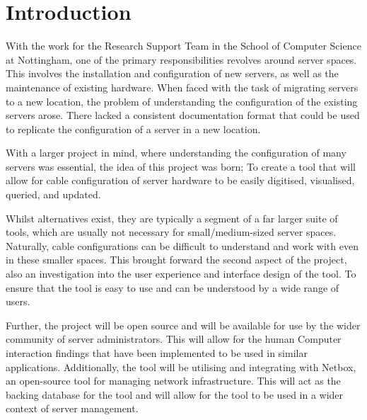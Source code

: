 \documentclass [11pt,a4paper]{article}
\begin{document}
\pagebreak

\tableofcontents
\pagebreak 
{}    

\setlength{\parskip}{2ex}

\section{Introduction}
\label{sec:introduction}
With the work for the Research Support Team in the School of Computer Science at Nottingham, one of the primary responsibilities revolves around server spaces. This involves the installation and configuration of new servers, as well as the maintenance of existing hardware. When faced with the task of migrating servers to a new location, the problem of understanding the configuration of the existing servers arose. There lacked a consistent documentation format that could be used to replicate the configuration of a server in a new location.

With a larger project in mind, where understanding the configuration of many servers was essential, the idea of this project was born; To create a tool that will allow for cable configuration of server hardware to be easily digitised, visualised, queried, and updated.

Whilst alternatives exist, they are typically a segment of a far larger suite of tools, which are usually not necessary for small/medium-sized server spaces. Naturally, cable configurations can be difficult to understand and work with even in these smaller spaces. This brought forward the second aspect of the project, also an investigation into the user experience and interface design of the tool. To ensure that the tool is easy to use and can be understood by a wide range of users.

Further, the project will be open source and will be available for use by the wider community of server administrators. This will allow for the human Computer interaction findings that have been implemented to be used in similar applications. Additionally, the tool will be utilising and integrating with Netbox\cite{Netbox}, an open-source tool for managing network infrastructure. This will act as the backing database for the tool and will allow for the tool to be used in a wider context of server management.
\end{document}
